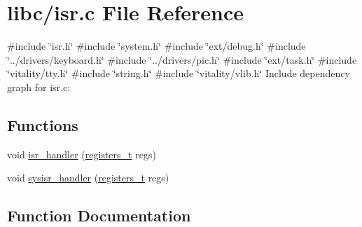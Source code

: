 \hypertarget{a00080}{}\section{libc/isr.c File Reference}
\label{a00080}
{\ttfamily \#include \char`\"{}isr.\+h\char`\"{}}\newline
{\ttfamily \#include \char`\"{}system.\+h\char`\"{}}\newline
{\ttfamily \#include \char`\"{}ext/debug.\+h\char`\"{}}\newline
{\ttfamily \#include \char`\"{}../drivers/keyboard.\+h\char`\"{}}\newline
{\ttfamily \#include \char`\"{}../drivers/pic.\+h\char`\"{}}\newline
{\ttfamily \#include \char`\"{}ext/task.\+h\char`\"{}}\newline
{\ttfamily \#include \char`\"{}vitality/tty.\+h\char`\"{}}\newline
{\ttfamily \#include \char`\"{}string.\+h\char`\"{}}\newline
{\ttfamily \#include \char`\"{}vitality/vlib.\+h\char`\"{}}\newline
Include dependency graph for isr.\+c\+:
\subsection*{Functions}
\begin{DoxyCompactItemize}
\item 
void \hyperlink{a00080_a700e3ca056bf69296370f504f2cb6cc8_a700e3ca056bf69296370f504f2cb6cc8}{isr\+\_\+handler} (\hyperlink{a00083_adf58dbaf6139b4957c348711f2026957_adf58dbaf6139b4957c348711f2026957}{registers\+\_\+t} regs)
\item 
void \hyperlink{a00080_abd1fa375737cd5ecd84c082738e3b195_abd1fa375737cd5ecd84c082738e3b195}{sysisr\+\_\+handler} (\hyperlink{a00083_adf58dbaf6139b4957c348711f2026957_adf58dbaf6139b4957c348711f2026957}{registers\+\_\+t} regs)
\end{DoxyCompactItemize}


\subsection{Function Documentation}
\mbox{\label{a00080_a700e3ca056bf69296370f504f2cb6cc8_a700e3ca056bf69296370f504f2cb6cc8}} 

